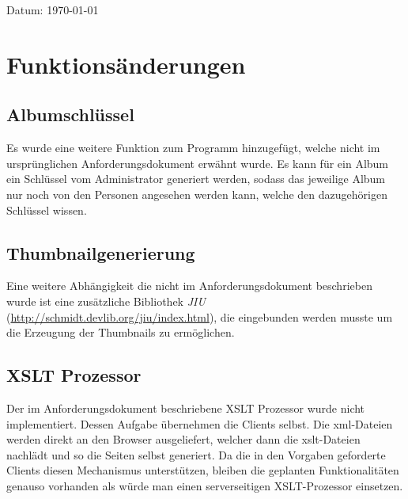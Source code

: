 \documentclass[a4paper,12pt,liststotocnumbered]{scrartcl}
\begin{document}
\begin{center}
	Datum: \today\\
\end{center}

\newpage


\section{Funktionsänderungen}

\subsection{Albumschlüssel}

Es wurde eine weitere Funktion zum Programm hinzugefügt, welche nicht im
ursprünglichen Anforderungsdokument erwähnt wurde. Es kann für ein Album
ein Schlüssel vom Administrator generiert werden, sodass das jeweilige
Album nur noch von den Personen angesehen werden kann, welche den
dazugehörigen Schlüssel wissen.

\subsection{Thumbnailgenerierung}

Eine weitere Abhängigkeit die nicht im Anforderungsdokument beschrieben
wurde ist eine zusätzliche Bibliothek \emph{JIU}
(\url{http://schmidt.devlib.org/jiu/index.html}), die eingebunden werden
musste um die Erzeugung der Thumbnails zu ermöglichen.

\subsection{XSLT Prozessor}

Der im Anforderungsdokument beschriebene XSLT Prozessor wurde nicht
implementiert.  Dessen Aufgabe übernehmen die Clients selbst. Die
xml-Dateien werden direkt an den Browser ausgeliefert, welcher dann die
xslt-Dateien nachlädt und so die Seiten selbst generiert. Da die in den
Vorgaben geforderte Clients diesen Mechanismus unterstützen, bleiben die
geplanten Funktionalitäten genauso vorhanden als würde man einen
serverseitigen XSLT-Prozessor einsetzen.

\newpage
\end{document}
